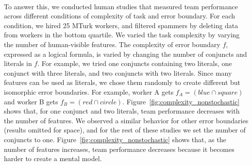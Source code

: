 \documentclass[letterpaper]{article} %
\newcommand{\?}{\mbox{?}}
\begin{document}
\\
\noindent To answer this, we conducted human studies that measured team performance across different conditions of complexity of task and error boundary.
For each condition, we hired 25 MTurk workers, and filtered spammers by deleting data from workers in the bottom quartile.  
We varied the task complexity by varying the number of human-visible features. The complexity of error boundary $f$, expressed as a logical formula, is varied by changing the number of conjuncts and literals in $f$. For example, we tried one conjuncts containing two literals, one conjunct with three literals, and two conjuncts with two literals. 
Since many features can be used as literals,  we chose them randomly to create different but isomorphic error boundaries. For example, worker A gets $f_A = (blue \cap square)$ and worker B gets $f_B = (red \cap circle)$.
Figure~\ref{fig:complexity_nonstochastic} shows that, for one conjunct and two literals, team performance decreases with the number of features. We observed a similar behavior for other error boundaries (results omitted for space), and for the rest of these studies we set the number of conjuncts to one.
 Figure~\ref{fig:complexity_nonstochastic} shows that, as the number of features increases, team performance decreases because it becomes harder to create a mental model.
\end{document}
